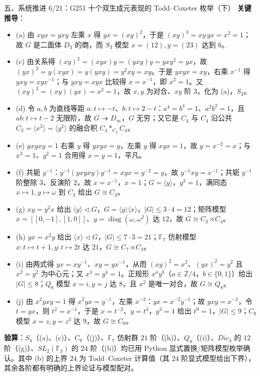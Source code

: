 \documentclass[aspectratio=169,10pt,fontset=none]{ctexbeamer}
\newcommand{\key}[1]{\textcolor{ink}{\bfseries #1}}
\begin{document}
\begin{frame}[t]{五、系统推进 6/21：G251 十个双生成元表现的 Todd–Coxeter 枚举（下）}
\scriptsize
\key{关键推导}：
\begin{itemize}
\item (a) 由 $xyx=yxy$ 左乘 $x$ 得 $yx=(xy)^2$，于是 $(xy)^3=xy\,yx=x^2=1$；故 $G$ 是二面体 $D_3$ 的商，而 $S_3$ 模型 $x=(12),y=(23)$ 达到 $6$。
\item (c) 由关系得 $(xy)^2=(xyx)y=(yxy)y=yxy^2=yx$，故 $(yx)^2=y(xyx)=y(yxy)=y^2xy=xy$。于是 $yxyx=xy$，右乘 $x^{-1}$ 得 $yxy=xyx^{-1}$；与 $yxy=xyx$ 比较得 $x=x^{-1}$，即 $x^2=1$。又 $(xy)^3=(xy)(yx)=x^2=1$，故 $x,y$ 为对合、$xy$ 阶 $3$，化为 (a)，$S_3$。
\item (d) 令 $a,b$ 为直线等距 $a:t\mapsto-t$、$b:t\mapsto2-t$：$a^4=b^4=1$、$a^2b^2=1$，且 $ab:t\mapsto t-2$ 无限阶，故 $G\twoheadrightarrow D_\infty$，$G$ 无穷；又它是 $C_4$ 与 $C_4$ 沿公共 $C_2=\langle x^2\rangle=\langle y^2\rangle$ 的融合积 $C_4*_{C_2}C_4$。
\item (e) $yxyxy=1$ 右乘 $y$ 得 $yxyx=y$，左乘 $y$ 得 $xyx=1$，故 $y=x^{-2}=x$；与 $x^3=1$、$y^2=1$ 合用得 $x=y=1$，平凡。
\item (f) 共轭 $y^{-1}$：$y^{-1}(yxyxy)y^{-1}=xyx=y^{-2}=y$，故 $y^{-1}xy=x^{-1}$；共轭 $y^{-1}$ 阶整除 $3$、反演阶 $2$，故 $x=x^{-1}$，$x=1$；$G=\langle y\rangle$，$y^3=1$，满同态 $x\mapsto1,y\mapsto\omega$ 到 $C_3$ 给出 $G\cong C_3$。
\item (g) $xy=y^2x$ 给出 $\langle y\rangle\triangleleft G$，$G=\langle y\rangle\langle x\rangle$，$|G|\le3\cdot4=12$；矩阵模型 $x=[[0,-1],[1,0]]$、$y=\operatorname{diag}(\omega,\omega^2)$ 达 $12$，故 $G\cong C_3\rtimes C_4$。
\item (h) $yx=x^2y$ 给出 $\langle x\rangle\triangleleft G$，$|G|\le7\cdot3=21$；$\mathbb F_7$ 仿射模型 $x:t\mapsto t+1,y:t\mapsto2t$ 达 $21$，$G\cong C_7\rtimes C_3$。
\item (i) 由两式得 $yx=xy^{-1}$、$xy=yx^{-1}$，从而 $(xy)^2=x^2$、$(yx)^2=y^2$ 且 $x^2=y^2$ 为中心元；又 $x^4=y^4=1$。正规形 $x^ay^b$（$a\in\mathbb Z/4$，$b\in\{0,1\}$）给出 $|G|\le8$；$Q_8$ 模型 $x=i,y=j$ 达 $8$，且 $x^2$ 是唯一对合，故 $G\cong Q_8$。
\item (j) 由 $x^2yxy=1$ 得 $x^2yx=y^{-1}$，左乘 $x^{-2}$：$yx=x^{-2}y^{-1}$；故 $yxy=x^{-2}$，令 $t=yx$，则 $t^2=x^{-1}$，于是 $x=t^{-2}$、$y=t^3$，$y^3=1$ 给出 $t^9=1$，$|G|\le9$；$C_9$ 模型 $x=z,y=z^3$ 达 $9$，故 $G\cong C_9$。
\end{itemize}
\key{验算}：$S_3$（(a)、(c)）、$C_9$（(j)）、$\mathbb F_7$ 仿射群 $21$ 阶（(h)）、$Q_8$（(i)）、$Dic_3$ 的 $12$ 阶（(g)）、$SL_2(\mathbb F_3)$ 的 $24$ 阶（(b)）均已用 Python 显式置换/矩阵模型枚举确认。其中 (b) 的上界 $24$ 为 Todd--Coxeter 计算值（其 $24$ 阶显式模型给出下界），其余各阶都有明确的上界论证与模型配对。
\end{frame}
\end{document}
